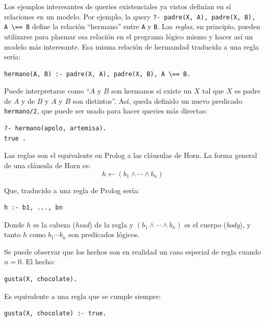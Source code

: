 \documentclass[12pt,titlepage]{article}
\begin{document}
Los ejemplos interesantes de queries existenciales ya vistos definían en sí relaciones en un modelo. Por ejemplo, la query \lstinline|?- padre(X, A), padre(X, B), A \== B| define la relación ``hermano'' entre \lstinline|A| y \lstinline|B|. Las \emph{reglas}, en principio, pueden utilizarse para plasmar esa relación en el programa lógico mismo y hacer así un modelo más interesante. Esa misma relación de hermandad traducida a una regla sería:
\begin{lstlisting}
hermano(A, B) :- padre(X, A), padre(X, B), A \== B.
\end{lstlisting}

Puede interpretarse como ``$A$ y $B$ son hermanos si existe un $X$ tal que $X$ es padre de $A$ y de $B$ y $A$ y $B$ son distintos''. Así, queda definido un nuevo predicado \lstinline|hermano/2|, que puede ser usado para hacer queries más directas:
\begin{lstlisting}
?- hermano(apolo, artemisa).
true .
\end{lstlisting}

Las reglas son el equivalente en Prolog a las cláusulas de Horn. La forma general de una cláusula de Horn es:
\[
h \leftarrow (b_1 \land \cdots \land b_n)
\]

Que, traducido a una regla de Prolog sería:
\begin{lstlisting}
h :- b1, ..., bn
\end{lstlisting}

Donde $h$ es la cabeza (\emph{head}) de la regla y $(b_1 \land \cdots \land b_n)$ es el cuerpo (\emph{body}), y tanto $h$ como $b_1 \cdots b_n$ son predicados lógicos.

Se puede observar que los hechos son en realidad un caso especial de regla cuando $n=0$. El hecho:
\begin{lstlisting}
gusta(X, chocolate).
\end{lstlisting}

Es equivalente a una regla que se cumple siempre:
\begin{lstlisting}
gusta(X, chocolate) :- true.
\end{lstlisting}
\end{document}
